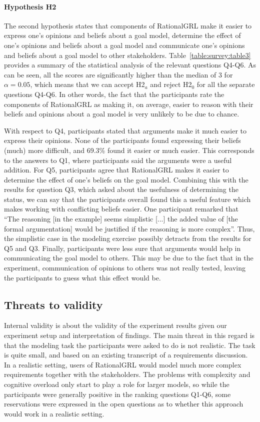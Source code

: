 \paragraph{Hypothesis H2}
The second hypothesis states that components of RationalGRL make it easier to express one's opinions and beliefs about a goal model, determine the effect of one's opinions and beliefs about a goal model and communicate one's opinions and beliefs about a goal model to other stakeholders. Table~\ref{table:survey:table3} provides a summary of the statistical analysis of the relevant questions Q4-Q6. As can be seen, all the scores are significantly higher than the median of 3 for $\alpha = 0.05$, which means that we can accept H2$_{a}$ and reject H2$_{0}$ for all the separate questions Q4-Q6. In other words, the fact that the participants rate the components of RationalGRL as making it, on average, easier to reason with their beliefs and opinions about a goal model is very unlikely to be due to chance. 

With respect to Q4, participants stated that arguments make it much easier to express their opinions. None of the participants found expressing their beliefs (much) more difficult, and 69.3\% found it easier or much easier. This corresponds to the answers to Q1, where participants said the arguments were a useful addition. For Q5, participants agree that RationalGRL makes it easier to determine the effect of one's beliefs on the goal model. Combining this with the results for question Q3, which asked about the usefulness of determining the status, we can say that the participants overall found this a useful feature which makes working with conflicting beliefs easier. One participant remarked that ``The reasoning [in the example] seems simplistic [...] the added value of [the formal argumentation] would be justified if the reasoning is more complex''. Thus, the simplistic case in the modeling exercise possibly detracts from the results for Q5 and Q3. Finally, participants were less sure that arguments would help in communicating the goal model to others. This may be due to the fact that in the experiment, communication of opinions to others was not really tested, leaving the participants to guess what this effect would be.  

\subsection{Threats to validity}
Internal validity is about the validity of the experiment results given our experiment setup and interpretation of findings. The main threat in this regard is that the modeling task the participants were asked to do is not realistic. The task is quite small, and based on an existing transcript of a requirements discussion. In a realistic setting, users of RationalGRL would model much more complex requirements together with the stakeholders. The problems with complexity and cognitive overload only start to play a role for larger models, so while the participants were generally positive in the ranking questions Q1-Q6, some reservations were expressed in the open questions as to whether this approach would work in a realistic setting. 

